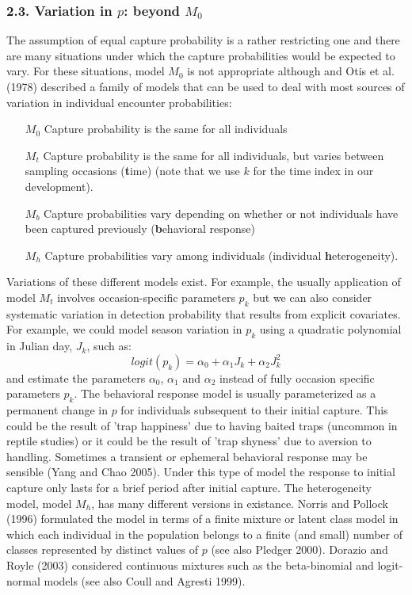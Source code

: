 \documentclass{book}
\begin{document}
\subsubsection*{2.3. Variation in $p$: beyond $M_0$}

The assumption of equal capture probability is a rather restricting
one and there are many situations under which the capture
probabilities would be expected to vary. For these situations, model
$M_0$ is not appropriate although and Otis et al. (1978) described a
family of models that can be used to deal with most sources of
variation in individual encounter probabilities:
\begin{itemize}
\item[$M_0$] Capture probability is the same for all individuals
\item[$M_t$] Capture probability is the same for all individuals, but
  varies between sampling occasions (\textbf{t}ime) (note that we use
  $k$ for the time index in our development).
\item[$M_b$] Capture probabilities vary depending on whether or not
  individuals have been captured previously (\textbf{b}ehavioral
  response)
\item[$M_h$] Capture probabilities vary among individuals (individual
  \textbf{h}eterogeneity).
\end{itemize}

Variations of these different models exist. For example, the usually
application of model $M_t$ involves occasion-specific parameters
$p_{k}$ but we can also consider systematic variation in detection
probability that results from explicit covariates. For example, we
could model season variation in $p_k$ using a quadratic polynomial
in Julian day, $J_{k}$, such as:
\[
 logit(p_{k}) = \alpha_0 + \alpha_1 J_{k} + \alpha_2 J^{2}_{k}
\]
and estimate the parameters $\alpha_0$, $\alpha_1$ and $\alpha_2$
instead of fully occasion specific parameters $p_k$.  The behavioral
response model is usually parameterized as a permanent change in $p$
for individuals subsequent to their initial capture. This could be the
result of 'trap happiness' due to having baited traps (uncommon in
reptile studies) or it could be the result of 'trap shyness' due to
aversion to handling. Sometimes a transient or ephemeral behavioral
response may be sensible (Yang and Chao 2005). Under this type of
model the response to initial capture only lasts for a brief period
after initial capture. The heterogeneity model, model $M_h$, has many
different versions in existance. Norris and Pollock (1996) formulated
the model in terms of a finite mixture or latent class model in which
each individual in the population belongs to a finite (and small)
number of classes represented by distinct values of $p$ (see also
Pledger 2000). Dorazio and Royle (2003) considered continuous mixtures
such as the beta-binomial and logit-normal models (see also Coull and
Agresti 1999).
\end{document}
